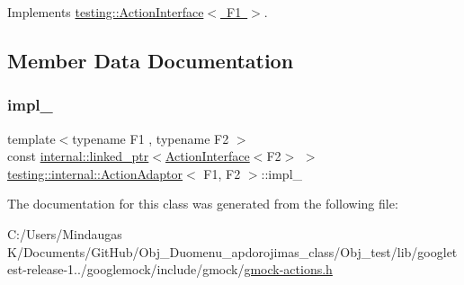 Implements \mbox{\hyperlink{classtesting_1_1_action_interface_a20f8624fcea1786f2992b358760422a0}{testing\+::\+Action\+Interface$<$ F1 $>$}}.



\subsection{Member Data Documentation}
\mbox{\label{classtesting_1_1internal_1_1_action_adaptor_a555b8bc3e770b9a0d824be1ee2403783}} 
\subsubsection{\texorpdfstring{impl\_}{impl\_}}
{\footnotesize\ttfamily template$<$typename F1 , typename F2 $>$ \\
const \mbox{\hyperlink{classtesting_1_1internal_1_1linked__ptr}{internal\+::linked\+\_\+ptr}}$<$\mbox{\hyperlink{classtesting_1_1_action_interface}{Action\+Interface}}$<$F2$>$ $>$ \mbox{\hyperlink{classtesting_1_1internal_1_1_action_adaptor}{testing\+::internal\+::\+Action\+Adaptor}}$<$ F1, F2 $>$\+::impl\+\_\+\hspace{0.3cm}{\ttfamily [private]}}



The documentation for this class was generated from the following file\+:\begin{DoxyCompactItemize}
\item 
C\+:/\+Users/\+Mindaugas K/\+Documents/\+Git\+Hub/\+Obj\+\_\+\+Duomenu\+\_\+apdorojimas\+\_\+class/\+Obj\+\_\+test/lib/googletest-\/release-\/1../googlemock/include/gmock/\mbox{\hyperlink{_obj__test_2lib_2googletest-release-1_88_81_2googlemock_2include_2gmock_2gmock-actions_8h}{gmock-\/actions.\+h}}\end{DoxyCompactItemize}
